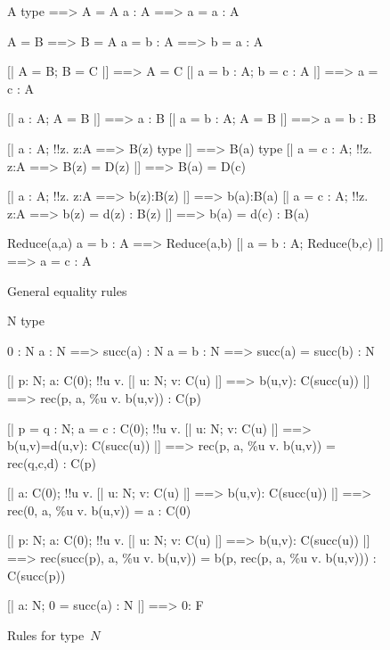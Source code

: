 \begin{figure} 
\begin{ttbox}
         A type ==> A = A
         a : A ==> a = a : A

          A = B ==> B = A
          a = b : A ==> b = a : A

        [| A = B;  B = C |] ==> A = C
        [| a = b : A;  b = c : A |] ==> a = c : A

       [| a : A;  A = B |] ==> a : B
      [| a = b : A;  A = B |] ==> a = b : B

        [| a : A;  !!z. z:A ==> B(z) type |] ==> B(a) type
       [| a = c : A;  !!z. z:A ==> B(z) = D(z) 
                  |] ==> B(a) = D(c)

        [| a : A;  !!z. z:A ==> b(z):B(z) |] ==> b(a):B(a)
       [| a = c : A;  !!z. z:A ==> b(z) = d(z) : B(z) 
                  |] ==> b(a) = d(c) : B(a)

          Reduce(a,a)
      a = b : A ==> Reduce(a,b)
         [| a = b : A;  Reduce(b,c) |] ==> a = c : A
\end{ttbox}
\caption{General equality rules} \label{ctt-equality}
\end{figure}


\begin{figure} 
\begin{ttbox}
        N type

       0 : N
   a : N ==> succ(a) : N
  a = b : N ==> succ(a) = succ(b) : N

        [| p: N;  a: C(0);  
             !!u v. [| u: N; v: C(u) |] ==> b(u,v): C(succ(u)) 
          |] ==> rec(p, a, \%u v. b(u,v)) : C(p)

       [| p = q : N;  a = c : C(0);  
             !!u v. [| u: N; v: C(u) |] ==> b(u,v)=d(u,v): C(succ(u))
          |] ==> rec(p, a, \%u v. b(u,v)) = rec(q,c,d) : C(p)

       [| a: C(0);  
             !!u v. [| u: N; v: C(u) |] ==> b(u,v): C(succ(u))
          |] ==> rec(0, a, \%u v. b(u,v)) = a : C(0)

   [| p: N;  a: C(0);  
             !!u v. [| u: N; v: C(u) |] ==> b(u,v): C(succ(u)) 
          |] ==> rec(succ(p), a, \%u v. b(u,v)) =
                 b(p, rec(p, a, \%u v. b(u,v))) : C(succ(p))

      [| a: N;  0 = succ(a) : N |] ==> 0: F
\end{ttbox}
\caption{Rules for type~$N$} \label{ctt-N}
\end{figure}


